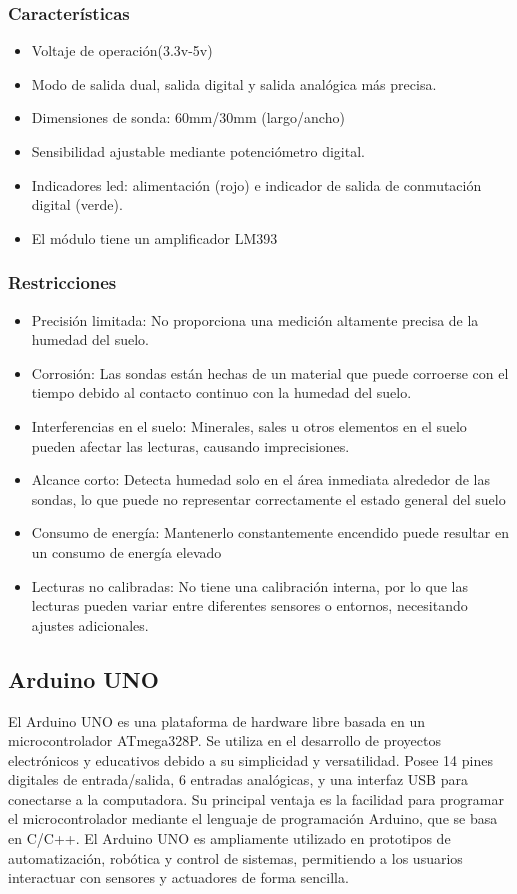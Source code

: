 \documentclass[conference]{IEEEtran}
\begin{document}
	\subsubsection{Características}
	\begin{itemize}
		\item Voltaje de operación(3.3v-5v)
		\item Modo de salida dual, salida digital y salida analógica más precisa.
		\item Dimensiones de sonda: 60mm/30mm (largo/ancho)
		\item Sensibilidad ajustable mediante potenciómetro digital.
		\item Indicadores led: alimentación (rojo) e indicador de salida de conmutación digital (verde).
		\item El módulo tiene un amplificador LM393
	\end{itemize}
	\subsubsection{Restricciones}
	\begin{itemize}
		\item Precisión limitada: No proporciona una medición altamente precisa de la humedad del suelo. 
		\item Corrosión: Las sondas están hechas de un material que puede corroerse con el tiempo debido al contacto continuo con la humedad del suelo.
		\item Interferencias en el suelo: Minerales, sales u otros elementos en el suelo pueden afectar las lecturas, causando imprecisiones.
		\item Alcance corto: Detecta humedad solo en el área inmediata alrededor de las sondas, lo que puede no representar correctamente el estado general del suelo
		\item Consumo de energía: Mantenerlo constantemente encendido puede resultar en un consumo de energía elevado
		\item Lecturas no calibradas: No tiene una calibración interna, por lo que las lecturas pueden variar entre diferentes sensores o entornos, necesitando ajustes adicionales.
	\end{itemize}
	
	\subsection{Arduino UNO}
	El Arduino UNO es una plataforma de hardware libre basada en un microcontrolador ATmega328P. Se utiliza en el desarrollo de proyectos electrónicos y educativos debido a su simplicidad y versatilidad. Posee 14 pines digitales de entrada/salida, 6 entradas analógicas, y una interfaz USB para conectarse a la computadora. Su principal ventaja es la facilidad para programar el microcontrolador mediante el lenguaje de programación Arduino, que se basa en C/C++. El Arduino UNO es ampliamente utilizado en prototipos de automatización, robótica y control de sistemas, permitiendo a los usuarios interactuar con sensores y actuadores de forma sencilla.
	
\end{document}
